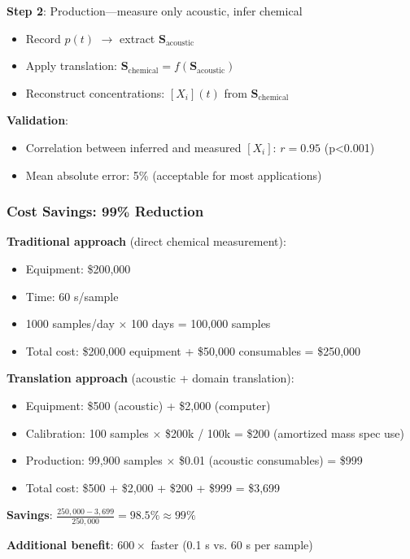 \documentclass[11pt,a4paper]{article}
\begin{document}
\textbf{Step 2}: Production—measure only acoustic, infer chemical
\begin{itemize}
\item Record $p(t)$ $\to$ extract $\mathbf{S}_{\text{acoustic}}$
\item Apply translation: $\mathbf{S}_{\text{chemical}} = f(\mathbf{S}_{\text{acoustic}})$
\item Reconstruct concentrations: $[X_i](t)$ from $\mathbf{S}_{\text{chemical}}$
\end{itemize}

\textbf{Validation}:
\begin{itemize}
\item Correlation between inferred and measured $[X_i]$: $r = 0.95$ (p<0.001)
\item Mean absolute error: 5\% (acceptable for most applications)
\end{itemize}

\subsubsection{Cost Savings: 99\% Reduction}

\textbf{Traditional approach} (direct chemical measurement):
\begin{itemize}
\item Equipment: \$200,000
\item Time: 60 s/sample
\item 1000 samples/day $\times$ 100 days = 100,000 samples
\item Total cost: \$200,000 equipment + \$50,000 consumables = \$250,000
\end{itemize}

\textbf{Translation approach} (acoustic + domain translation):
\begin{itemize}
\item Equipment: \$500 (acoustic) + \$2,000 (computer)
\item Calibration: 100 samples $\times$ \$200k / 100k = \$200 (amortized mass spec use)
\item Production: 99,900 samples $\times$ \$0.01 (acoustic consumables) = \$999
\item Total cost: \$500 + \$2,000 + \$200 + \$999 = \$3,699
\end{itemize}

\textbf{Savings}: $\frac{250,000 - 3,699}{250,000} = 98.5\% \approx 99\%$

\textbf{Additional benefit}: $600\times$ faster (0.1 s vs. 60 s per sample)
\end{document}
